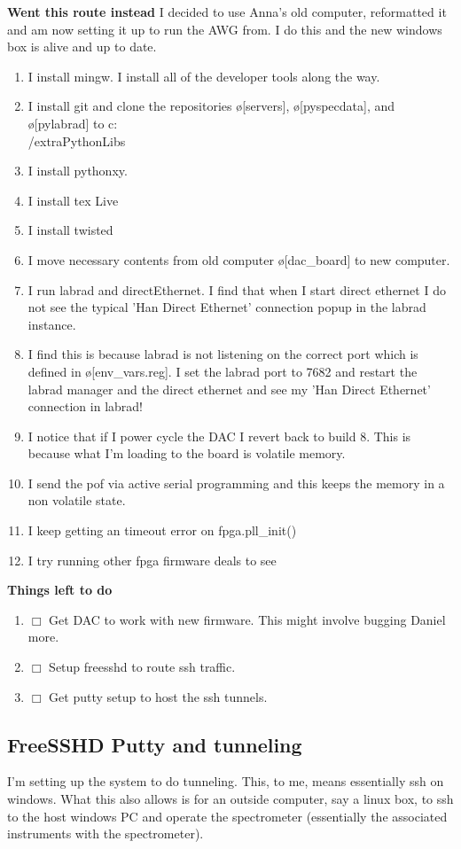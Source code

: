 \documentclass[10pt]{book}
\begin{document}
{{\bf Went this route instead}
I decided to use Anna's old computer, reformatted it and am now setting it up to run the AWG from. I do this and the new windows box is alive and up to date.
\begin{enumerate}
    \item I install mingw. I install all of the developer tools along the way.
    \item I install git and clone the repositories \o[servers]{}, \o[pyspecdata]{}, and \o[pylabrad]{} to c:\\/extraPythonLibs
    \item I install pythonxy.
    \item I install tex Live
    \item I install twisted
    \item I move necessary contents from old computer \o[dac\_board]{} to new computer.
    \item I run labrad and directEthernet. I find that when I start direct ethernet I do not see the typical 'Han Direct Ethernet' connection popup in the labrad instance.
    \item I find this is because labrad is not listening on the correct port which is defined in \o[env\_vars.reg]{}. I set the labrad port to 7682 and restart the labrad manager and the direct ethernet and see my 'Han Direct Ethernet' connection in labrad!
    \item I notice that if I power cycle the DAC I revert back to build 8. This is because what I'm loading to the board is volatile memory.
    \item I send the pof via active serial programming and this keeps the memory in a non volatile state.
    \item I keep getting an timeout error on fpga.pll\_init()
    \item I try running other fpga firmware deals to see 
\end{enumerate}

{\bf Things left to do}
\begin{enumerate}
    \item $\Box$ Get DAC to work with new firmware. This might involve bugging Daniel more.
    \item $\Box$ Setup freesshd to route ssh traffic.
    \item $\Box$ Get putty setup to host the ssh tunnels.
\end{enumerate}

\subsection{FreeSSHD Putty and tunneling}
I'm setting up the system to do tunneling. This, to me, means essentially ssh on windows. What this also allows is for an outside computer, say a linux box, to ssh to the host windows PC and operate the spectrometer (essentially the associated instruments with the spectrometer).

}
\end{document}
